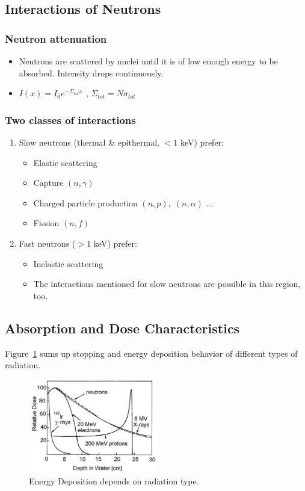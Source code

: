 \subsection{Interactions of Neutrons}
\subsubsection{Neutron attenuation}
\begin{itemize}
    \item Neutrons are scattered by nuclei until it is of low enough energy to be absorbed. Intensity drops continuously.
    \item $I(x)=I_0e^{-\Sigma_{tot}x}$ , $\Sigma_{tot}=N\sigma_{tot}$
\end{itemize}
\subsubsection{Two classes of interactions}
\begin{enumerate}
    \item Slow neutrons (thermal \& epithermal, $<1$ keV) prefer:
    \begin{itemize}
        \item Elastic scattering
        \item Capture $(n,\gamma)$
        \item Charged particle production $(n,p),\;(n,\alpha)$ ...
        \item Fission $(n,f)$
    \end{itemize}
    \item Fast neutrons ($>1$ keV) prefer:
    \begin{itemize}
        \item Inelastic scattering
        \item The interactions mentioned for slow neutrons are possible in this region, too.
    \end{itemize}
\end{enumerate}
\subsection{Absorption and Dose Characteristics}
Figure~\ref{fig:dose_of_diff_radiation} sums up stopping and energy deposition behavior of different types of radiation. 
\begin{figure}[ht]
    \centering
    \includegraphics[width=0.5\textwidth]{images/dose_of_diff_radiation.png}
    \caption{Energy Deposition depends on radiation type.}
    \label{fig:dose_of_diff_radiation}
\end{figure}
